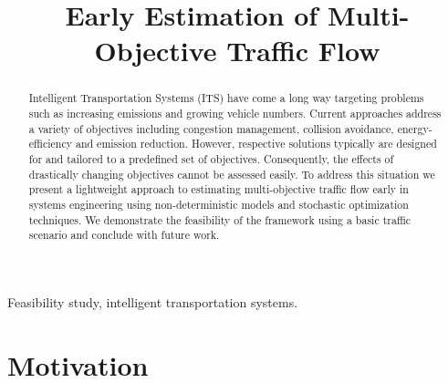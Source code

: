 \documentclass[conference]{../cls/IEEEtran}
\begin{document}
\title{Early Estimation of Multi-Objective Traffic Flow}

\author{
 \and
 }

\maketitle

\begin{abstract}
Intelligent Transportation Systems (ITS) have come a long way targeting
problems such as increasing emissions and growing vehicle numbers. Current
approaches address a variety of objectives including congestion management,
collision avoidance, energy-efficiency and emission reduction. However,
respective solutions typically are designed for and tailored to a predefined set
of objectives. Consequently, the effects of drastically changing objectives
cannot be assessed easily. To address this situation we present a lightweight
approach to estimating multi-objective traffic flow early in systems engineering
using non-deterministic models and stochastic optimization techniques. We
demonstrate the feasibility of the framework using a basic traffic scenario and
conclude with future work.
\end{abstract}

\begin{IEEEkeywords}
Feasibility study, intelligent transportation systems.
\end{IEEEkeywords}

\section{Motivation}
\label{sec:motivation}
\end{document}
